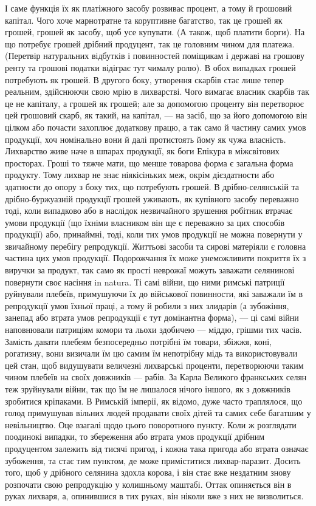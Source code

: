 І саме функція їх як платіжного засобу розвивас процент, а тому й грошовий
капітал. Чого хоче марнотратне та коруптивне багатство, так це грошей
як грошей, грошей як засобу, щоб усе купувати. (А також, щоб платити борги).
На що потребує грошей дрібний продуцент, так це головним чином для платежа.
(Перетвір натуральних відбутків і повинностей поміщикам і державі на грошову
ренту та грошові податки відіграє тут чималу ролю). В обох випадках грошей
потребують як грошей. В другого боку, утворення скарбів стає лише тепер реальним,
здійснюючи свою мрію в лихварстві. Чого вимагає власник скарбів так це не капіталу,
а грошей як грошей; але за допомогою проценту він перетворює цей грошовий
скарб, як такий, на капітал, — на засіб, що за його допомогою він цілком або
почасти захоплює додаткову працю, а так само й частину самих умов продукції,
хоч номінально вони й далі протистоять йому як чужа власність.
Лихварство живе наче в шпарах продукції, як боги Епікура в міжсвітових просторах.
Гроші то тяжче мати, що менше товарова форма є загальна форма
продукту. Тому лихвар не знає ніякісіньких меж, окрім дієздатности або здатности
до опору з боку тих, що потребують грошей. В дрібно-селянській та
дрібно-буржуазній продукції грошей уживають, як купівного засобу переважно
тоді, коли випадково або в наслідок незвичайного зрушення робітник втрачає
умови продукції (що їхніми власником він ще є переважно за цих способів продукції)
або, принаймні, тоді, коли тих умов продукції не можна повернути у звичайному перебігу
репродукції. Життьові засоби та сирові матеріяли є головна частина цих умов
продукції. Подорожчання їх може унеможливити покриття їх з виручки за продукт,
так само як прості неврожаї можуть заважати селянинові повернути своє насіння in
natura. Ті самі війни, що ними римські патриції руйнували плебеїв, примушуючи
їх до військової повинности, які заважали їм в репродукції умов їхньої праці,
а тому й робили з них злидарів (а зубожіння, занепад або втрата умов
репродукції є тут домінантна форма), — ці самі війни наповнювали патриціям
комори та льохи здобичею — міддю, грішми тих часів. Замість давати плебеям
безпосередньо потрібні їм товари, збіжжя, коні, рогатизну, вони визичали
їм цю самим їм непотрібну мідь та використовували цей стан, щоб видушувати
величезні лихварські проценти, перетворюючи таким чином плебеїв на своїх
довжників — рабів. За Карла Великого франкських селян теж зруйнували війни,
так що їм не лишалося нічого іншого, як з довжників зробитися кріпаками.
В Римській імперії, як відомо, дуже часто траплялося, що голод примушував
вільних людей продавати своїх дітей та самих себе багатшим у невільництво. Оце
взагалі щодо цього поворотного пункту. Коли ж розглядати поодинокі випадки,
то збереження або втрата умов продукції дрібним продуцентом залежить від
тисячі пригод, і кожна така пригода або втрата означає зубоження, та стає
тим пунктом, де може приміститися лихвар-паразит. Досить того, щоб у дрібного
селянина здохла корова, і він стає вже нездатним знову розпочати свою репродукцію
у колишньому маштабі. Оттак опиняється він в руках лихваря, а, опинившися
в тих руках, він ніколи вже з них не визволиться.

